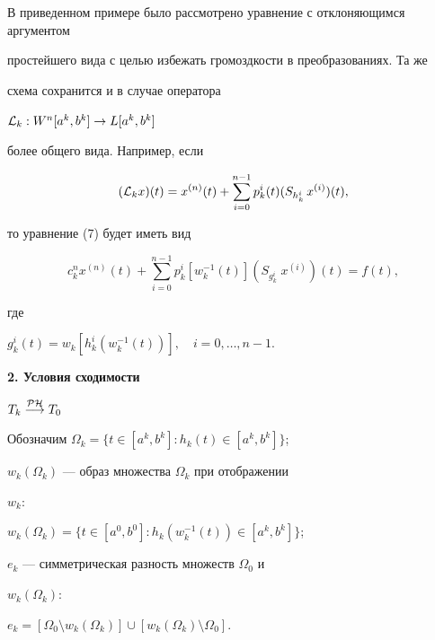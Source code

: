 \begin{note}


В приведенном примере было рассмотрено уравнение с отклоняющимся аргументом


простейшего вида с целью избежать громоздкости в преобразованиях. Та же


схема сохранится и в случае оператора


${\cal L}_k:W^n[a^k,b^k]\to L[a^k,b^k]$


более общего вида. Например, если


$$


({\cal L}_k x)(t) = x^{(n)}(t) +


\sum_{i=0}^{n-1} p_k^i(t) (S_{h_k^i} \,x^{(i)})(t),


$$


то уравнение (7) будет иметь вид


$$


c^n_k x^{(n)}(t) + \sum_{i=0}^{n-1}


p_k^i[w_k^{-1}(t)](S_{g_k^i}\;x^{(i)})(t) = f(t),


$$


где


$g_k^i(t) = w_k[h_k^i(w_k^{-1}(t))],\quad i=0,\dotsc,n-1$.


\end{note}





\begin{center}


{\bf 2. Условия сходимости


$T_k \overset{\cal P\cal H}{\longrightarrow}{} T_0$}


\end{center}


\bigskip


\addtocounter{section}{1}





Обозначим $\Omega_k = \{t\in[a^k,b^k]:h_k(t)\in [a^k,b^k]\}$;


$w_k(\Omega_k)$ --- образ множества $\Omega_k$ при отображении


$w_k$:


$w_k(\Omega_k) = \{t\in[a^0,b^0]: h_k(w_k^{-1}(t))\in[a^k,b^k]\}$;


$e_k$ --- симметрическая разность множеств $\Omega_0$ и


$w_k(\Omega_k)$:


$e_k=[\Omega_0\setminus w_k(\Omega_k)]\cup[w_k(\Omega_k)\setminus\Omega_0]$.


